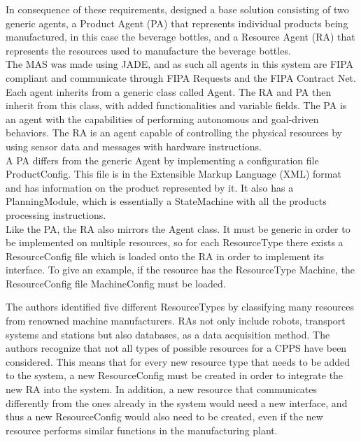 In consequence of these requirements, \citeauthor{bottling_plant_part1} designed a base solution consisting of two generic agents, a Product Agent (PA) that represents individual products being manufactured, in this case the beverage bottles, and a Resource Agent (RA) that represents the resources used to manufacture the beverage bottles.\\

The MAS was made using JADE, and as such all agents in this system are FIPA compliant and communicate through FIPA Requests and the FIPA Contract Net.\\

Each agent inherits from a generic class called Agent. The RA and PA then inherit from this class, with added functionalities and variable fields. The PA is an agent with the capabilities of performing autonomous and goal-driven behaviors. The RA is an agent capable of controlling the physical resources by using sensor data and messages with hardware instructions.\\

A PA differs from the generic Agent by implementing a configuration file ProductConfig. This file is in the Extensible Markup Language (XML) format and has information on the product represented by it. It also has a PlanningModule, which is essentially a StateMachine with all the products processing instructions.\\

Like the PA, the RA also mirrors the Agent class. It must be generic in order to be implemented on multiple resources, so for each ResourceType there exists a ResourceConfig file which is loaded onto the RA in order to implement its interface. To give an example, if the resource has the ResourceType Machine, the ResourceConfig file MachineConfig must be loaded.

The authors identified five different ResourceTypes by classifying many resources from renowned machine manufacturers. RAs not only include robots, transport systems and stations but also databases, as a data acquisition method. The authors recognize that not all types of possible resources for a CPPS have been considered. This means that for every new resource type that needs to be added to the system, a new ResourceConfig must be created in order to integrate the new RA into the system. In addition, a new resource that communicates differently from the ones already in the system would need a new interface, and thus a new ResourceConfig would also need to be created, even if the new resource performs similar functions in the manufacturing plant.\\

